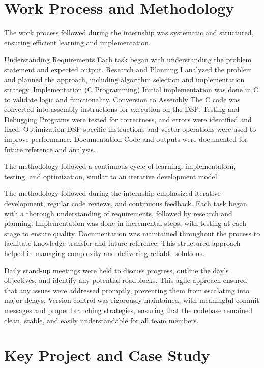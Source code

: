 \documentclass[12pt,a4paper]{report}
\begin{document}
\section{Work Process and Methodology}

The work process followed during the internship was systematic and structured, ensuring efficient learning and implementation.


Understanding Requirements Each task began with understanding the problem statement and expected output. Research and Planning I analyzed the problem and planned the approach, including algorithm selection and implementation strategy. Implementation (C Programming) Initial implementation was done in C to validate logic and functionality. Conversion to Assembly The C code was converted into assembly instructions for execution on the DSP. Testing and Debugging Programs were tested for correctness, and errors were identified and fixed. Optimization DSP-specific instructions and vector operations were used to improve performance. Documentation Code and outputs were documented for future reference and analysis.


The methodology followed a continuous cycle of learning, implementation, testing, and optimization, similar to an iterative development model.


The methodology followed during the internship emphasized iterative development, regular code reviews, and continuous feedback. Each task began with a thorough understanding of requirements, followed by research and planning. Implementation was done in incremental steps, with testing at each stage to ensure quality. Documentation was maintained throughout the process to facilitate knowledge transfer and future reference. This structured approach helped in managing complexity and delivering reliable solutions.


Daily stand-up meetings were held to discuss progress, outline the day's objectives, and identify any potential roadblocks. This agile approach ensured that any issues were addressed promptly, preventing them from escalating into major delays. Version control was rigorously maintained, with meaningful commit messages and proper branching strategies, ensuring that the codebase remained clean, stable, and easily understandable for all team members.


\section{Key Project and Case Study}
\end{document}
